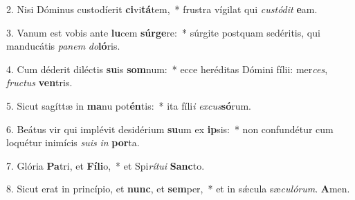 2. Nisi Dóminus custodíerit \textbf{ci}vi\textbf{tá}tem,~*  frustra vígilat qui \textit{cus}\textit{tó}\textit{dit} \textbf{e}am.\

3. Vanum est vobis ante \textbf{lu}cem \textbf{súr}\textbf{ge}re:~*  súrgite postquam sedéritis, qui manducátis \textit{pa}\textit{nem} \textit{do}\textbf{ló}ris.\

4. Cum déderit diléctis \textbf{su}is \textbf{som}num:~*  ecce heréditas Dómini fílii: mer\textit{ces}, \textit{fruc}\textit{tus} \textbf{ven}tris.\

5. Sicut sagíttæ in \textbf{ma}nu pot\textbf{én}tis:~*  ita fíli\textit{i} \textit{ex}\textit{cus}\textbf{só}rum.\

6. Beátus vir qui implévit desidérium \textbf{su}um ex \textbf{ip}sis:~*  non confundétur cum loquétur inimícis \textit{su}\textit{is} \textit{in} \textbf{por}ta.\

7. Glória \textbf{Pa}tri, et \textbf{Fí}\textbf{li}o,~*  et Spi\textit{rí}\textit{tu}\textit{i} \textbf{Sanc}to.\

8. Sicut erat in princípio, et \textbf{nunc}, et \textbf{sem}per,~*  et in sǽcula sæ\textit{cu}\textit{ló}\textit{rum}. \textbf{A}men.\

